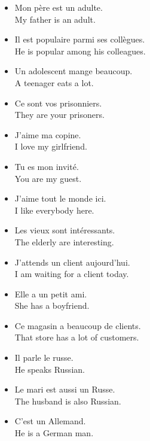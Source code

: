 \begin{itemize}
	\item  Mon p{\`e}re est un adulte. \\ My father is an adult.
	\item  Il est populaire parmi ses coll{\`e}gues. \\ He is popular among his colleagues.
	\item  Un adolescent mange beaucoup. \\ A teenager eats a lot.
	\item  Ce sont vos prisonniers. \\ They are your prisoners.
	\item  J'aime ma copine. \\ I love my girlfriend.
	\item  Tu es mon invit{\'e}. \\ You are my guest.
	\item  J'aime tout le monde ici. \\ I like everybody here.
	\item  Les vieux sont int{\'e}ressants. \\ The elderly are interesting.
	\item  J'attends un client aujourd'hui. \\ I am waiting for a client today.
	\item  Elle a un petit ami. \\ She has a boyfriend.
	\item  Ce magasin a beaucoup de clients. \\ That store has a lot of customers.
	\item  Il parle le russe. \\ He speaks Russian.
	\item  Le mari est aussi un Russe. \\ The husband is also Russian.
	\item  C'est un Allemand. \\ He is a German man.
\end{itemize}






















